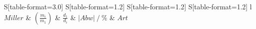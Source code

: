 \begin{table}
    \centering
    \caption{Vergleich mit der Steinsalzstruktur.}
    \label{table:A70}
    \begin{tabular}{
	S[table-format=3.0]
	S[table-format=1.2]
	S[table-format=1.2]
	S[table-format=1.2]
	l
	}
	\toprule
	{$Miller$}		& {$\left(\frac{m_i}{m_1}\right)$}		& 
	{$\frac{d_1}{d_i}$}		& {$|Abw|\:/\: \si{\percent}$}		& 
	{$Art$}		\\ 
	\midrule
    
    \bottomrule
    \end{tabular}
    \end{table}
